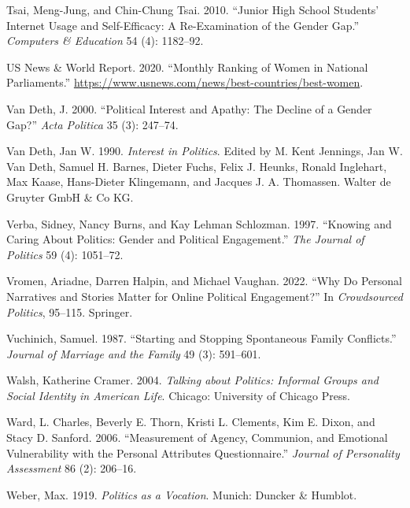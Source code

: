 \documentclass[
  letterpaper,
  DIV=11,
  numbers=noendperiod]{scrreprt}
\newlength{\cslhangindent}
\newlength{\cslentryspacingunit} %
\newenvironment{CSLReferences}[2] %
 {%
  \setlength{\parindent}{0pt}
  \ifodd #1
  \let\oldpar\par
  \def\par{\hangindent=\cslhangindent\oldpar}
  \fi
  \setlength{\parskip}{#2\cslentryspacingunit}
 }%
 {}
\begin{document}
\begin{CSLReferences}{1}{0}
\leavevmode{}%
Tsai, Meng-Jung, and Chin-Chung Tsai. 2010. {``{Junior High School
Students' Internet Usage and Self-Efficacy: A Re-Examination of the
Gender Gap}.''} \emph{Computers \& Education} 54 (4): 1182--92.

\leavevmode{}%
US News \& World Report. 2020. {``{Monthly Ranking of Women in National
Parliaments}.''}
\url{https://www.usnews.com/news/best-countries/best-women}.

\leavevmode{}%
Van Deth, J. 2000. {``{Political Interest and Apathy: The Decline of a
Gender Gap?}''} \emph{Acta Politica} 35 (3): 247--74.

\leavevmode{}%
Van Deth, Jan W. 1990. \emph{Interest in Politics}. Edited by M. Kent
Jennings, Jan W. Van Deth, Samuel H. Barnes, Dieter Fuchs, Felix J.
Heunks, Ronald Inglehart, Max Kaase, Hans-Dieter Klingemann, and Jacques
J. A. Thomassen. Walter de Gruyter GmbH \& Co KG.

\leavevmode{}%
Verba, Sidney, Nancy Burns, and Kay Lehman Schlozman. 1997. {``{Knowing
and Caring About Politics: Gender and Political Engagement}.''}
\emph{The Journal of Politics} 59 (4): 1051--72.

\leavevmode{}%
Vromen, Ariadne, Darren Halpin, and Michael Vaughan. 2022. {``{Why Do
Personal Narratives and Stories Matter for Online Political
Engagement?}''} In \emph{Crowdsourced Politics}, 95--115. Springer.

\leavevmode{}%
Vuchinich, Samuel. 1987. {``{Starting and Stopping Spontaneous Family
Conflicts}.''} \emph{Journal of Marriage and the Family} 49 (3):
591--601.

\leavevmode{}%
Walsh, Katherine Cramer. 2004. \emph{{Talking about Politics: Informal
Groups and Social Identity in American Life}}. Chicago: University of
Chicago Press.

\leavevmode{}%
Ward, L. Charles, Beverly E. Thorn, Kristi L. Clements, Kim E. Dixon,
and Stacy D. Sanford. 2006. {``{Measurement of Agency, Communion, and
Emotional Vulnerability with the Personal Attributes Questionnaire}.''}
\emph{Journal of Personality Assessment} 86 (2): 206--16.

\leavevmode{}%
Weber, Max. 1919. \emph{{Politics as a Vocation}}. Munich: Duncker \&
Humblot.


\end{CSLReferences}
\end{document}
